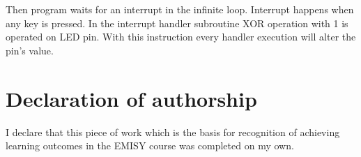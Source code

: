 \documentclass{article}
\begin{document}
Then program waits for an interrupt in the infinite loop. Interrupt happens when
any key is pressed. In the interrupt handler subroutine XOR operation with 1 is operated on
LED pin. With this instruction every handler execution will alter the pin's value.

\section*{Declaration of authorship}
I declare that this piece of work which is the basis for recognition of achieving learning outcomes in the EMISY course was completed on my own.
\end{document}
